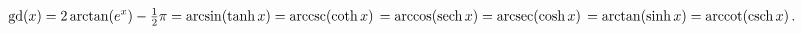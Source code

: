 \[\mathop{\mathrm{gd}\/}\nolimits\!\left(x\right)=2\mathop{\mathrm{arctan}\/}%
\nolimits\!\left(e^{x}\right)-\tfrac{1}{2}\pi\\
=\mathop{\mathrm{arcsin}\/}\nolimits\!\left(\mathop{\tanh\/}\nolimits x\right)%
=\mathop{\mathrm{arccsc}\/}\nolimits\!\left(\mathop{\coth\/}\nolimits x\right)%
\\
=\mathop{\mathrm{arccos}\/}\nolimits\!\left(\mathop{\mathrm{sech}\/}\nolimits x%
\right)=\mathop{\mathrm{arcsec}\/}\nolimits\!\left(\mathop{\cosh\/}\nolimits x%
\right)\\
=\mathop{\mathrm{arctan}\/}\nolimits\!\left(\mathop{\sinh\/}\nolimits x\right)%
=\mathop{\mathrm{arccot}\/}\nolimits\!\left(\mathop{\mathrm{csch}\/}\nolimits x%
\right).\]